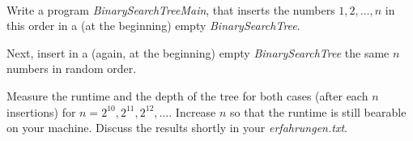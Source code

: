  \\
Write a program \emph{BinarySearchTreeMain}, that inserts the numbers $1, 2, 
\ldots, n$ in this order in a (at the beginning) empty 
\emph{BinarySearchTree}.

Next, insert in a (again, at the beginning) empty \emph{BinarySearchTree}
the same $n$ numbers in random order.

Measure the runtime and the depth of the tree for both cases (after each $n$ 
insertions) for $n = 2^{10}, 2^{11}, 2^{12},
\ldots$. Increase $n$ so that the runtime is still bearable on your machine. 
Discuss the results shortly in your \emph{erfahrungen.txt}.